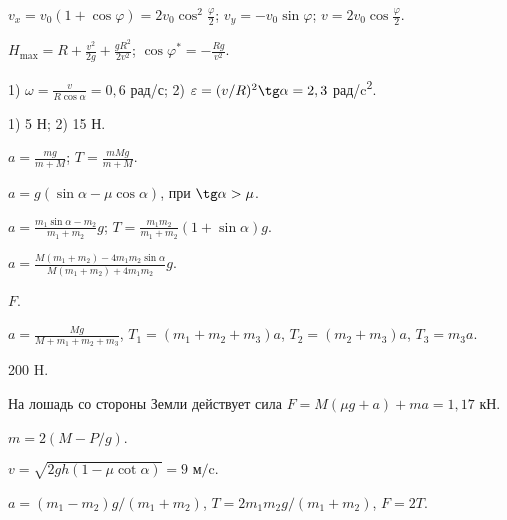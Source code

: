\begin{Answer}{65}
$v_x = v_0 (1 + \cos \varphi) = 2v_0 \cos^2 \frac{\varphi}{2}$; $v_y = -v_0 \sin \varphi$; $v = 2v_0 \cos \frac{\varphi}{2}$.
\end{Answer}
\begin{Answer}{66}
$H_{\max} = R + \frac{v^2}{2g} + \frac{gR^2}{2v^2}$; $\cos \varphi^{*} = - \frac{Rg}{v^2}$.
\end{Answer}
\begin{Answer}{67}
1) $\omega = \frac{v}{R \cos \alpha} = 0,6$ рад/с; 2) $\varepsilon = (v/R)^2 \tg \alpha = 2,3$ рад/c\textsuperscript{2}.
\end{Answer}
\begin{Answer}{68}
1) 5 Н; 2) 15 Н.
\end{Answer}
\begin{Answer}{69}
$a = \frac{mg}{m+M}$; $T = \frac{mMg}{m+M}$.
\end{Answer}
\begin{Answer}{70}
$a = g (\sin \alpha - \mu \cos \alpha)$, при $\tg \alpha > \mu$.
\end{Answer}
\begin{Answer}{71}
$a = \frac{m_1 \sin \alpha - m_2}{m_1 + m_2}g$; $T = \frac{m_1 m_2}{m_1 + m_2}\left( 1+ \sin \alpha \right)g$.
\end{Answer}
\begin{Answer}{72}
$a = \frac{M(m_1 + m_2) - 4 m_1 m_2 \sin \alpha}{M(m_1 + m_2) + 4 m_1 m_2}g$.
\end{Answer}
\begin{Answer}{74}
$F$.
\end{Answer}
\begin{Answer}{79}
$a = \frac{Mg}{M + m_1 +m_2 +m_3}$, $T_1 = (m_1 +m_2 +m_3)a$, $T_2 = (m_2 +m_3)a$, $T_3 = m_3 a$.
\end{Answer}
\begin{Answer}{80}
200 H.
\end{Answer}
\begin{Answer}{82}
На лошадь со стороны Земли действует сила $F = M(\mu g + a) + ma = 1,17$ кН.
\end{Answer}
\begin{Answer}{83}
$m = 2(M - P/g)$.
\end{Answer}
\begin{Answer}{84}
$ v = \sqrt{2gh(1 - \mu \cot \alpha)} = 9 \textrm{ м/c}.$
\end{Answer}
\begin{Answer}{85}
$a = (m_1 - m_2)g / (m_1 + m_2)$, $T = 2 m_1 m_2 g /(m_1 + m_2)$, $F = 2T$.
\end{Answer}
